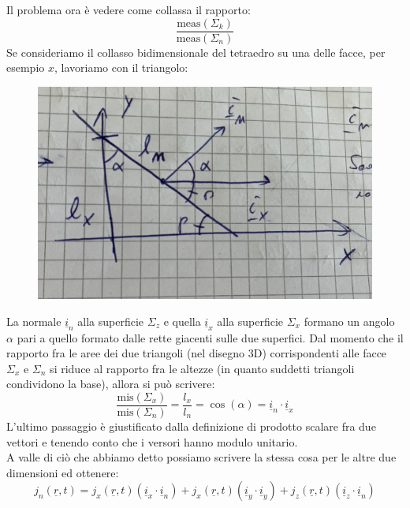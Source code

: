 \documentclass{book}
\begin{document}
        Il problema ora è vedere come collassa il rapporto:
        \begin{equation}
            \frac{\textrm{meas}(\Sigma_{k})}{\textrm{meas}(\Sigma_{n})}
        \end{equation}
        Se consideriamo il collasso bidimensionale del tetraedro su una delle facce, per esempio $x$, lavoriamo con il triangolo:
        \begin{figure}[h!]
            \centering
            \includegraphics[width=0.75\linewidth]{img//Chapter_one/chap1img3.png}
            \caption{}
        \end{figure}
        La normale $\underline{i}_{n}$ alla superficie $\Sigma_{z}$ e quella $\underline{i}_{x}$ alla superficie $\Sigma_{x}$ formano un angolo $\alpha$ pari a quello formato dalle rette giacenti sulle due superfici. Dal momento che il rapporto fra le aree dei due triangoli (nel disegno 3D) corrispondenti alle facce $\Sigma_{x}$ e $\Sigma_{n}$ si riduce al rapporto fra le altezze (in quanto suddetti triangoli condividono la base), allora si può scrivere:
        \begin{equation}
            \frac{\textrm{mis}(\Sigma_{x})}{\textrm{mis}(\Sigma_{n})} = \frac{l_{x}}{l_{n}} = \cos{(\alpha)} = \underline{i}_{n} \cdot \underline{i}_{x}
        \end{equation}
        L'ultimo passaggio è giustificato dalla definizione di prodotto scalare fra due vettori e tenendo conto che i versori hanno modulo unitario.\\
        A valle di ciò che abbiamo detto possiamo scrivere la stessa cosa per le altre due dimensioni ed ottenere:
        \begin{equation}
            j_{n}(\underline{r},t) = j_{x}(\underline{r},t)(\underline{i}_{x}\cdot \underline{i}_{n})+j_{x}(\underline{r},t)(\underline{i}_{y}\cdot \underline{i}_{y})+j_{z}(\underline{r},t)(\underline{i}_{z}\cdot \underline{i}_{n})
        \end{equation}
\end{document}
